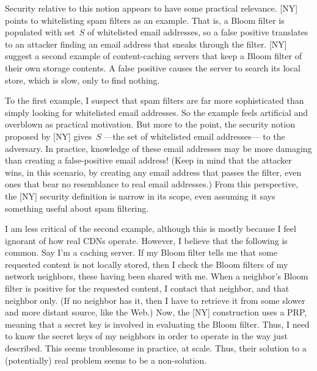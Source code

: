 
Security relative to this notion appears to have some practical relevance.  [NY] points to whitelisting spam filters as an example.  That is, a Bloom filter is populated with set~$S$ of whitelisted email addresses, so a false positive translates to an attacker finding an email address that sneaks through the filter.  [NY] suggest a second example of content-caching servers that keep a Bloom filter of their own storage contents.  A false positive causes the server to search its local store, which is slow, only to find nothing.

To the first example, I suspect that spam filters are far more sophisticated than simply looking for whitelisted email addresses.  So the example feels artificial and overblown as practical motivation.  But more to the point, the security notion proposed by [NY] gives~$S$ ---the set of whitelisted email addresses--- to the adversary.  In practice, knowledge of these email addresses may be more damaging than creating a false-positive email address! (Keep in mind that the attacker wins, in this scenario, by creating any email address that passes the filter, even ones that bear no resemblance to real email addresses.)  From this perspective, the [NY] security definition is narrow in its scope, even assuming it says something useful about spam filtering.

 

I am less critical of the second example, although this is mostly because I feel ignorant of how real CDNs operate.  However, I believe that the following is common.  Say I'm a caching server.  If my Bloom filter tells me that some requested content is not locally stored, then I check the Bloom filters of my network neighbors, these having been shared with me.  When a neighbor's Bloom filter is positive for the requested content, I contact that neighbor, and that neighbor only.  (If no neighbor has it, then I have to retrieve it from some slower and more distant source, like the Web.)  Now, the [NY] construction uses a PRP, meaning that a secret key is involved in evaluating the Bloom filter.  Thus, I need to know the secret keys of my neighbors in order to operate in the way just described.  This seems troublesome in practice, at scale.  Thus, their solution to a (potentially) real problem seems to be a non-solution.

